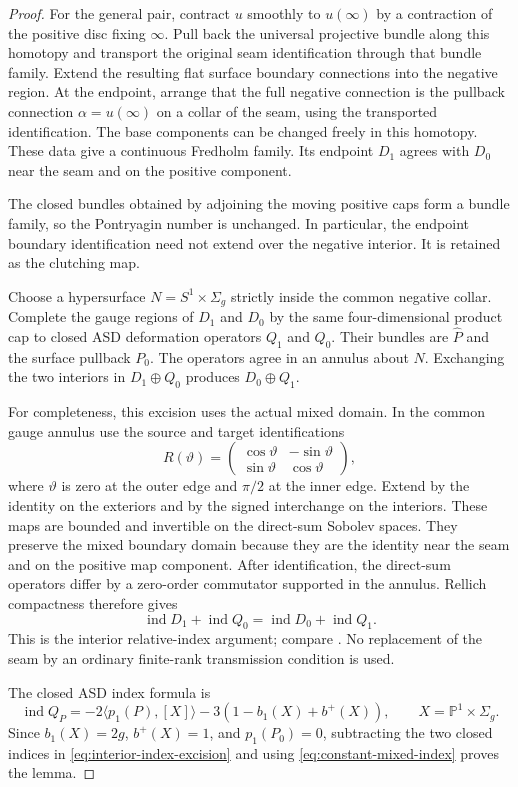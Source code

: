 \documentclass[11pt]{amsart}
\theoremstyle{definition}
\theoremstyle{remark}
\theoremstyle{plain}
\newcommand{\PP}{\mathbb{P}}
\newcommand{\ind}{\operatorname{ind}}
\begin{document}
\begin{proof}
For the general pair, contract $u$ smoothly to $u(\infty)$ by a
contraction of the positive disc fixing $\infty$. Pull back the universal
projective bundle along this homotopy and transport the original seam
identification through that bundle family. Extend the resulting flat
surface boundary connections into the negative region. At the endpoint,
arrange that the full negative connection is the pullback connection
$\alpha=u(\infty)$ on a collar of the seam, using the transported
identification. The base components can be changed freely in this
homotopy. These data give a continuous Fredholm family. Its endpoint
$D_1$ agrees with $D_0$ near the seam and on the positive component.

The closed bundles obtained by adjoining the moving positive caps form
a bundle family, so the Pontryagin number is unchanged. In particular,
the endpoint boundary identification need not extend over the negative
interior. It is retained as the clutching map.

Choose a hypersurface $N=S^1\times\Sigma_g$ strictly inside the common
negative collar. Complete the gauge regions of $D_1$ and $D_0$ by the
same four-dimensional product cap to closed ASD deformation operators
$Q_1$ and $Q_0$. Their bundles are $\widehat P$ and the surface pullback
$P_0$. The operators agree in an annulus about $N$. Exchanging the two
interiors in $D_1\oplus Q_0$ produces $D_0\oplus Q_1$.

For completeness, this excision uses the actual mixed domain. In the
common gauge annulus use the source and target identifications
\[
 R(\vartheta)=
 \begin{pmatrix}\cos\vartheta&-\sin\vartheta\\
                 \sin\vartheta&\cos\vartheta\end{pmatrix},
\]
where $\vartheta$ is zero at the outer edge and $\pi/2$ at the inner
edge. Extend by the identity on the exteriors and by the signed
interchange on the interiors. These maps are bounded and invertible on
the direct-sum Sobolev spaces. They preserve the mixed boundary domain
because they are the identity near the seam and on the positive map
component. After identification, the direct-sum operators differ by a
zero-order commutator supported in the annulus. Rellich compactness
therefore gives
\begin{equation}\label{eq:interior-index-excision}
 \ind D_1+\ind Q_0=\ind D_0+\ind Q_1.
\end{equation}
This is the interior relative-index argument; compare
\cite[Section~6.2]{BaerBallmann16}. No replacement of the seam by an
ordinary finite-rank transmission condition is used.

The closed ASD index formula \cite{DonaldsonKronheimer90} is
\[
 \ind Q_P=-2\langle p_1(P),[X]\rangle
             -3(1-b_1(X)+b^+(X)),\qquad X=\PP^1\times\Sigma_g.
\]
Since $b_1(X)=2g$, $b^+(X)=1$, and $p_1(P_0)=0$, subtracting the two
closed indices in \eqref{eq:interior-index-excision} and using
\eqref{eq:constant-mixed-index} proves the lemma.
\end{proof}
\end{document}
